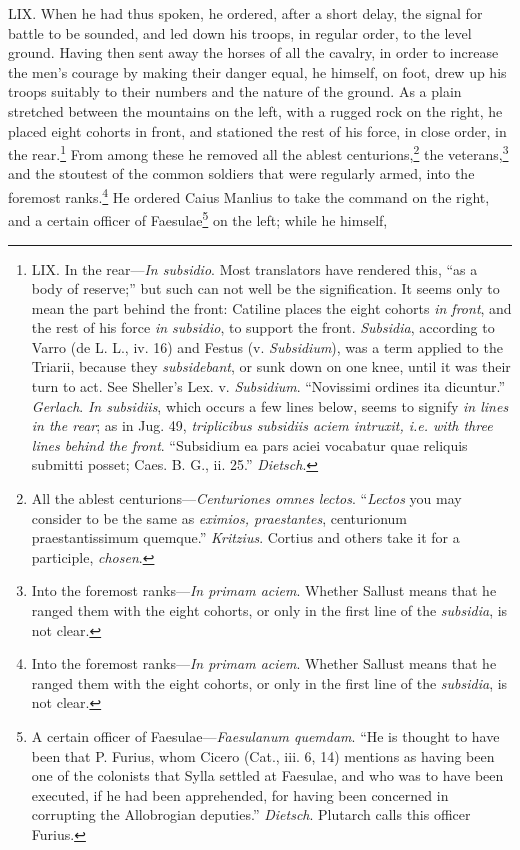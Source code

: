 LIX. When he had thus spoken, he ordered, after a short delay, the
signal for battle to be sounded, and led down his troops, in regular
order, to the level ground. Having then sent away the horses of all
the cavalry, in order to increase the men's courage by making their
danger equal, he himself, on foot, drew up his troops suitably to
their numbers and the nature of the ground. As a plain stretched
between the mountains on the left, with a rugged rock on the right, he
placed eight cohorts in front, and stationed the rest of his force, in
close order, in the rear.\footnote{LIX. In the rear—\emph{In subsidio}. Most translators have
rendered this, ``as a body of reserve;'' but such can not well be the
signification. It seems only to mean the part behind the front:
Catiline places the eight cohorts \emph{in front}, and the rest of his
force \emph{in subsidio}, to support the front. \emph{Subsidia}, according to
Varro (de L. L., iv. 16) and Festus (v. \emph{Subsidium}), was a term
applied to the Triarii, because they \emph{subsidebant}, or sunk down on
one knee, until it was their turn to act. See Sheller's Lex. v.
\emph{Subsidium}. ``Novissimi ordines ita dicuntur.'' \emph{Gerlach}. \emph{In
subsidiis}, which occurs a few lines below, seems to signify \emph{in lines
in the rear}; as in Jug. 49, \emph{triplicibus subsidiis aciem intruxit,
i.e. with three lines behind the front}. ``Subsidium ea pars aciei
vocabatur quae reliquis submitti posset; Caes. B. G., ii. 25.''
\emph{Dietsch}.} From among these he removed all the
ablest centurions,\footnote{All the ablest centurions—\emph{Centuriones omnes lectos}.
``\emph{Lectos} you may consider to be the same as \emph{eximios, praestantes},
centurionum praestantissimum quemque.'' \emph{Kritzius}. Cortius and others
take it for a participle, \emph{chosen}.} the veterans,\footnote{Into the foremost ranks—\emph{In primam aciem}. Whether Sallust
means that he ranged them with the eight cohorts, or only in the first
line of the \emph{subsidia}, is not clear.} and the stoutest of the
common soldiers that were regularly armed, into the foremost
ranks.\footnote{Into the foremost ranks—\emph{In primam aciem}. Whether Sallust
means that he ranged them with the eight cohorts, or only in the first
line of the \emph{subsidia}, is not clear.} He ordered Caius Manlius to take the command on the right,
and a certain officer of Faesulae\footnote{A certain officer of Faesulae—\emph{Faesulanum quemdam}. ``He is
thought to have been that P. Furius, whom Cicero (Cat., iii. 6, 14)
mentions as having been one of the colonists that Sylla settled at
Faesulae, and who was to have been executed, if he had been
apprehended, for having been concerned in corrupting the Allobrogian
deputies.'' \emph{Dietsch}. Plutarch calls this officer Furius.} on the left; while he himself,
